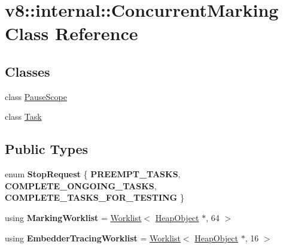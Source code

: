 \hypertarget{classv8_1_1internal_1_1ConcurrentMarking}{}\section{v8\+:\+:internal\+:\+:Concurrent\+Marking Class Reference}
\label{classv8_1_1internal_1_1ConcurrentMarking}
\subsection*{Classes}
\begin{DoxyCompactItemize}
\item 
class \mbox{\hyperlink{classv8_1_1internal_1_1ConcurrentMarking_1_1PauseScope}{Pause\+Scope}}
\item 
class \mbox{\hyperlink{classv8_1_1internal_1_1ConcurrentMarking_1_1Task}{Task}}
\end{DoxyCompactItemize}
\subsection*{Public Types}
\begin{DoxyCompactItemize}
\item 
\mbox{\label{classv8_1_1internal_1_1ConcurrentMarking_aee8fd462ab10c7db4ee21677cd7a59cb}} 
enum {\bfseries Stop\+Request} \{ {\bfseries P\+R\+E\+E\+M\+P\+T\+\_\+\+T\+A\+S\+KS}, 
{\bfseries C\+O\+M\+P\+L\+E\+T\+E\+\_\+\+O\+N\+G\+O\+I\+N\+G\+\_\+\+T\+A\+S\+KS}, 
{\bfseries C\+O\+M\+P\+L\+E\+T\+E\+\_\+\+T\+A\+S\+K\+S\+\_\+\+F\+O\+R\+\_\+\+T\+E\+S\+T\+I\+NG}
 \}
\item 
\mbox{\label{classv8_1_1internal_1_1ConcurrentMarking_af35da9505e9c2ddaf40e97b3137ade20}} 
using {\bfseries Marking\+Worklist} = \mbox{\hyperlink{classv8_1_1internal_1_1Worklist}{Worklist}}$<$ \mbox{\hyperlink{classv8_1_1internal_1_1HeapObject}{Heap\+Object}} $\ast$, 64 $>$
\item 
\mbox{\label{classv8_1_1internal_1_1ConcurrentMarking_a45354292f0ad6f6bfebaa17625c778c6}} 
using {\bfseries Embedder\+Tracing\+Worklist} = \mbox{\hyperlink{classv8_1_1internal_1_1Worklist}{Worklist}}$<$ \mbox{\hyperlink{classv8_1_1internal_1_1HeapObject}{Heap\+Object}} $\ast$, 16 $>$
\end{DoxyCompactItemize}
